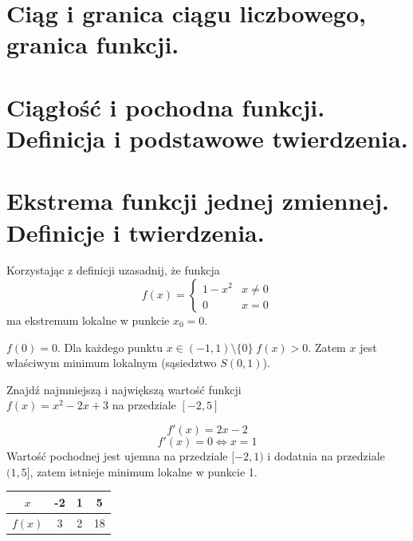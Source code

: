 \documentclass[12pt]{article}
\begin{document}
    \newpage

    \section{Ciąg i granica ciągu liczbowego, granica funkcji.}

    \newpage

    \section{Ciągłość i pochodna funkcji. Definicja i podstawowe twierdzenia.}


    \newpage

    \section{Ekstrema funkcji jednej zmiennej. Definicje i twierdzenia.}

        \begin{exercise}
            Korzystając z definicji uzasadnij, że funkcja 
                $$f(x) = \begin{cases}
                        1 - x^2 & x \neq 0 \\
                        0 & x = 0
                        \end{cases}$$
            ma ekstremum lokalne w punkcie $x_0 = 0$.
        \end{exercise}
        
        $f(0) = 0$. Dla każdego punktu $x \in (-1, 1) \setminus \{0\}\;  f(x) > 0$. Zatem $x$ jest właściwym minimum lokalnym (sąsiedztwo $S(0, 1)$).
        
        \begin{exercise}
            Znajdź najmniejszą i największą wartość funkcji\\ $f(x) = x^2 - 2x + 3$ na przedziale $[-2, 5]$
        \end{exercise}

        $$f'(x) = 2x - 2$$ 
        $$f'(x) = 0 \Leftrightarrow x = 1$$
        Wartość pochodnej jest ujemna na przedziale $[-2, 1)$ i dodatnia na przedziale $(1, 5]$, zatem istnieje minimum lokalne w punkcie 1.
        
        \begin{center}
            \begin{tabular}{c||c|c|c}
                 $x$ & -2 & 1 & 5 \\
                 \hline
                 $f(x)$ & 3 & 2 & 18 \\   
            \end{tabular}
        \end{center}
\end{document}

